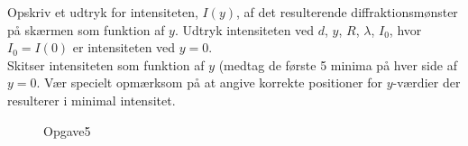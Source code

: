 \begin{subexercise}[a]
Opskriv et udtryk for intensiteten, $I\left( y \right) $, af det resulterende diffraktionsmønster på skærmen som funktion af $y$. Udtryk intensiteten ved $d$, $y$, $R$, $\lambda$, $I_0$, hvor $I_0= I\left( 0 \right) $ er intensiteten ved $y=0$.\\
Skitser intensiteten som funktion af $y$ (medtag de første 5 minima på hver side af $y = 0$. Vær specielt opmærksom på at angive korrekte positioner for $y$-værdier der resulterer i minimal intensitet.
\end{subexercise}
\begin{figure}[ht]
    \centering
    \caption{Opgave5}
    \label{fig:opgave5}
\end{figure}
\begin{solution}

\end{solution}

